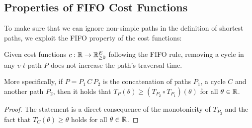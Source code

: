 \subsection{Properties of FIFO Cost Functions}

To make sure that we can ignore non-simple paths in the definition of shortest paths, we exploit the FIFO property of the cost functions:

\begin{proposition}\label{prop:removing-cycles-in-fifo-graphs}
    Given cost functions $c:\mathbb{R}\rightarrow\mathbb{R}_{\geq0}^E$ following the FIFO rule, removing a cycle in any $v$-$t$-path $P$ does not increase the path's traversal time.

    More specifically, if $P=P_1\, C \, P_2$ is the concatenation of paths $P_1$, a cycle $C$ and another path $P_2$, then it holds that $
        T_P(\theta) \geq \left(
        T_{P_2} \circ T_{P_1} \right)(\theta)$ for all $\theta\in\mathbb{R}$.
\end{proposition}
\begin{proof}
The statement is a direct consequence of the monotonicity of $T_{P_2}$ and the fact that $T_C(\theta) \geq \theta$ holds for all $\theta\in\mathbb{R}$.
\end{proof}

